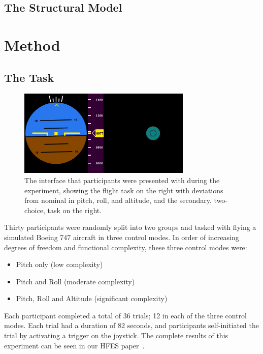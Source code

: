 \subsection{The Structural Model}
%

\section{Method}

\subsection{The Task}

\begin{figure}[b]
    \centering
    \includegraphics[width=3.25in]{figures/image1.png}
    \caption{The interface that participants were presented with during the experiment, showing the flight task on the right with deviations from nominal in pitch, roll, and altitude, and the secondary, two-choice, task on the right.}
    \label{fig:display}
\end{figure}

Thirty participants were randomly split into two groups and tasked with flying a simulated Boeing 747 aircraft in three control modes. In order of increasing degrees of freedom and functional complexity, these three control modes were:
\begin{itemize}
    \item Pitch only (low complexity)
    \item Pitch and Roll (moderate complexity)
    \item Pitch, Roll and Altitude (significant complexity)
\end{itemize}
Each participant completed a total of 36 trials; 12 in each of the three control modes.
Each trial had a duration of 82 seconds, and participants self-initiated the trial by activating a trigger on the joystick.
The complete results of this experiment can be seen in our HFES paper~\cite{RN42}.

